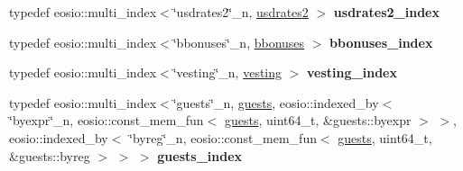 \begin{DoxyCompactItemize}
\item 
\mbox{\label{classp2p_abbacbe5996794991fcbfb554dae6dc41}} 
typedef eosio\+::multi\+\_\+index$<$\char`\"{}usdrates2\char`\"{}\+\_\+n, \mbox{\hyperlink{structp2p_1_1usdrates2}{usdrates2}} $>$ {\bfseries usdrates2\+\_\+index}
\item 
\mbox{\label{classp2p_ad2b234c3e4a379adfeebb42efe3fdb25}} 
typedef eosio\+::multi\+\_\+index$<$\char`\"{}bbonuses\char`\"{}\+\_\+n, \mbox{\hyperlink{structp2p_1_1bbonuses}{bbonuses}} $>$ {\bfseries bbonuses\+\_\+index}
\item 
\mbox{\label{classp2p_a9e10c97b92e817371f627c84094dce39}} 
typedef eosio\+::multi\+\_\+index$<$\char`\"{}vesting\char`\"{}\+\_\+n, \mbox{\hyperlink{structp2p_1_1vesting}{vesting}} $>$ {\bfseries vesting\+\_\+index}
\item 
\mbox{\label{classp2p_a08507c2c104ad7e99765afd19d4fdd10}} 
typedef eosio\+::multi\+\_\+index$<$\char`\"{}guests\char`\"{}\+\_\+n, \mbox{\hyperlink{structp2p_1_1guests}{guests}}, eosio\+::indexed\+\_\+by$<$ \char`\"{}byexpr\char`\"{}\+\_\+n, eosio\+::const\+\_\+mem\+\_\+fun$<$ \mbox{\hyperlink{structp2p_1_1guests}{guests}}, uint64\+\_\+t, \&guests\+::byexpr $>$ $>$, eosio\+::indexed\+\_\+by$<$ \char`\"{}byreg\char`\"{}\+\_\+n, eosio\+::const\+\_\+mem\+\_\+fun$<$ \mbox{\hyperlink{structp2p_1_1guests}{guests}}, uint64\+\_\+t, \&guests\+::byreg $>$ $>$ $>$ {\bfseries guests\+\_\+index}
\end{DoxyCompactItemize}
